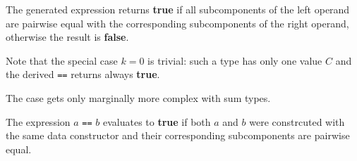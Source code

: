 The generated expression returns \textbf{true} if all subcomponents of the left operand are pairwise equal with the corresponding subcomponents of the right operand, otherwise the result is  \textbf{false}.

Note that the special case $k=0$ is trivial: such a type has only one value $C$ and the derived \texttt{==} returns always \textbf{true}.

The case gets only marginally more complex with sum types.

The expression $a$ \texttt{==} $b$ evaluates to \textbf{true} if both $a$ and $b$ were constrcuted with the same data constructor and their corresponding subcomponents are pairwise equal.

